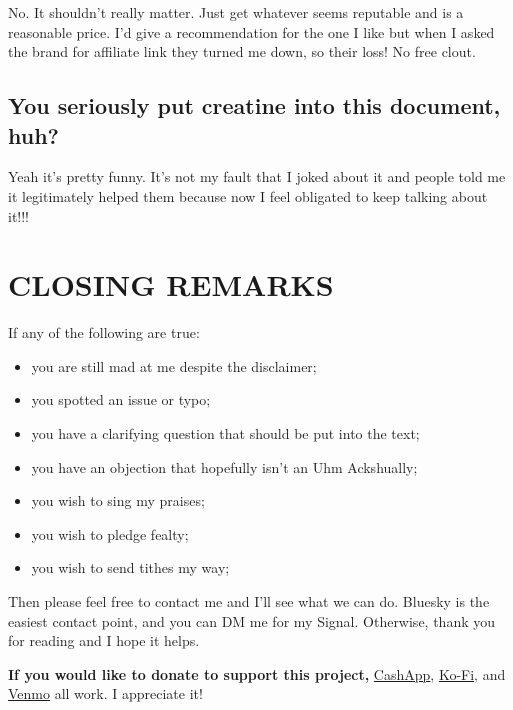\documentclass{article}
\begin{document}
No. It shouldn’t really matter. Just get whatever seems reputable and is a reasonable price. I’d give a recommendation for the one I like but when I asked the brand for affiliate link they turned me down, so their loss! No free clout.

\subsection{You seriously put creatine into this document, huh?}

Yeah it’s pretty funny. It’s not my fault that I joked about it and people told me it legitimately helped them because now I feel obligated to keep talking about it!!!



\section{CLOSING REMARKS}

If any of the following are true:

\begin{itemize}
\item you are still mad at me despite the disclaimer;

\item you spotted an issue or typo;

\item you have a clarifying question that should be put into the text;

\item you have an objection that hopefully isn’t an Uhm Ackshually;

\item you wish to sing my praises;

\item you wish to pledge fealty;

\item you wish to send tithes my way;
\end{itemize}

Then please feel free to contact me and I’ll see what we can do. Bluesky is the easiest contact point, and you can DM me for my Signal. Otherwise, thank you for reading and I hope it helps.

\textbf{If you would like to donate to support this project,} \href{https://cash.app/Katitties}{CashApp}, \href{https://ko-fi.com/katitties}{Ko-Fi}, and \href{https://account.venmo.com/u/katitties}{Venmo} all work. I appreciate it!
\end{document}
